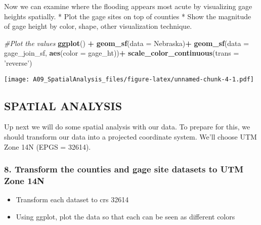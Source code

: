 \documentclass[]{article}
\newenvironment{Shaded}{\begin{snugshade}}{\end{snugshade}}
\newcommand{\KeywordTok}[1]{\textcolor[rgb]{0.13,0.29,0.53}{\textbf{#1}}}
\newcommand{\DataTypeTok}[1]{\textcolor[rgb]{0.13,0.29,0.53}{#1}}
\newcommand{\StringTok}[1]{\textcolor[rgb]{0.31,0.60,0.02}{#1}}
\newcommand{\CommentTok}[1]{\textcolor[rgb]{0.56,0.35,0.01}{\textit{#1}}}
\newcommand{\OperatorTok}[1]{\textcolor[rgb]{0.81,0.36,0.00}{\textbf{#1}}}
\newcommand{\NormalTok}[1]{#1}
\providecommand{\tightlist}{%
  \setlength{\itemsep}{0pt}\setlength{\parskip}{0pt}}
\begin{document}
Now we can examine where the flooding appears most acute by visualizing
gage heights spatially. * Plot the gage sites on top of counties * Show
the magnitude of gage height by color, shape, other visualization
technique.

\begin{Shaded}
\begin{Highlighting}[]
\CommentTok{#Plot the values}
\KeywordTok{ggplot}\NormalTok{() }\OperatorTok{+}
\StringTok{  }\KeywordTok{geom_sf}\NormalTok{(}\DataTypeTok{data =}\NormalTok{ Nebraska)}\OperatorTok{+}
\StringTok{  }\KeywordTok{geom_sf}\NormalTok{(}\DataTypeTok{data =}\NormalTok{ gage_join_sf, }\KeywordTok{aes}\NormalTok{(}\DataTypeTok{color =}\NormalTok{ gage_ht))}\OperatorTok{+}
\StringTok{  }\KeywordTok{scale_color_continuous}\NormalTok{(}\DataTypeTok{trans =} \StringTok{'reverse'}\NormalTok{)}
\end{Highlighting}
\end{Shaded}

\texttt{[image: A09\_SpatialAnalysis\_files/figure-latex/unnamed-chunk-4-1.pdf]}

\subsection{SPATIAL ANALYSIS}\label{spatial-analysis}

Up next we will do some spatial analysis with our data. To prepare for
this, we should transform our data into a projected coordinate system.
We'll choose UTM Zone 14N (EPGS = 32614).

\subsubsection{8. Transform the counties and gage site datasets to UTM
Zone
14N}\label{transform-the-counties-and-gage-site-datasets-to-utm-zone-14n}

\begin{itemize}
\tightlist
\item
  Transform each dataset to crs 32614
\item
  Using ggplot, plot the data so that each can be seen as different
  colors
\end{itemize}
\end{document}

